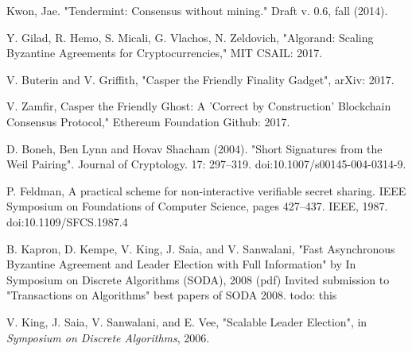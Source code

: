 \documentclass[10pt,journal,compsoc]{IEEEtran}
\begin{document}
\begin{thebibliography}{1}
 Kwon, Jae. "Tendermint: Consensus without mining." Draft v. 0.6, fall (2014).

Y. Gilad, R. Hemo, S. Micali, G. Vlachos, N. Zeldovich, "Algorand: Scaling Byzantine Agreements for Cryptocurrencies," MIT CSAIL: 2017.

V. Buterin and V. Griffith, "Casper the Friendly Finality Gadget", arXiv: 2017.

 V. Zamfir, Casper the Friendly Ghost: A 'Correct by Construction' Blockchain Consensus Protocol," Ethereum Foundation Github: 2017.

 D. Boneh, Ben Lynn and Hovav Shacham (2004). "Short Signatures from the Weil Pairing". Journal of Cryptology. 17: 297–319. doi:10.1007/s00145-004-0314-9.

 P. Feldman, A practical scheme for non-interactive verifiable secret sharing. IEEE Symposium on Foundations of Computer Science, pages 427--437. IEEE, 1987. doi:10.1109/SFCS.1987.4

B. Kapron, D. Kempe, V. King, J. Saia, and V. Sanwalani, "Fast Asynchronous Byzantine Agreement and Leader Election with Full Information" by In Symposium on Discrete Algorithms (SODA), 2008 (pdf) Invited submission to "Transactions on Algorithms" best papers of SODA 2008. todo: this

V. King, J. Saia, V. Sanwalani, and E. Vee, "Scalable Leader Election", in \emph{Symposium on Discrete Algorithms}, 2006.

\end{thebibliography}

% 










\end{document}
